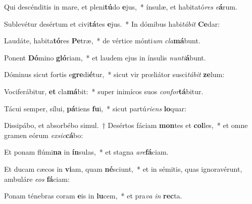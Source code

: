 \item Qui descénditis in mare, et pleni\textbf{tú}do \textbf{e}jus,~* ínsulæ, et habitató\textit{res} \textit{e}\textbf{á}rum.
\item Sublevétur desértum et civi\textbf{tá}tes \textbf{e}jus.~* In dómibus habi\textit{tá}\textit{bit} \textbf{Ce}dar:
\item Laudáte, habita\textbf{tó}res \textbf{Pe}træ,~* de vértice mónti\textit{um} \textit{cla}\textbf{má}bunt.
\item Ponent \textbf{Dó}mino \textbf{gló}riam,~* et laudem ejus in ínsulis \textit{nun}\textit{ti}\textbf{á}bunt.
\item Dóminus sicut fortis e\textbf{gre}di\textbf{é}tur,~* sicut vir prœliátor susci\textit{tá}\textit{bit} \textbf{ze}lum:
\item Vociferábitur, \textbf{et} cla\textbf{má}bit:~* super inimícos suos \textit{con}\textit{for}\textbf{tá}bitur.
\item Tácui semper, sílui, \textbf{pá}tiens \textbf{fu}i,~* sicut partú\textit{ri}\textit{ens} \textbf{lo}quar:
\item Dissipábo, et absorbébo simul.~† Desértos fáciam \textbf{mon}tes et \textbf{col}les,~* et omne gramen eórum \textit{ex}\textit{sic}\textbf{cá}bo:
\item Et ponam flúmi\textbf{na} in \textbf{ín}sulas,~* et stagna \textit{a}\textit{re}\textbf{fá}ciam.
\item Et ducam cæcos in \textbf{vi}am, quam \textbf{né}sciunt,~* et in sémitis, quas ignoravérunt, ambuláre \textit{e}\textit{os} \textbf{fá}ciam:
\item Ponam ténebras coram \textbf{e}is in \textbf{lu}cem,~* et pra\textit{va} \textit{in} \textbf{rec}ta.
